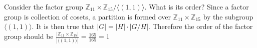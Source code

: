 \documentclass[../notes.tex]{subfiles}
\begin{document}
\begin{example}
	Consider the factor group $\mathbb{Z}_{11} \times \mathbb{Z}_{15} \slash \langle (1,1) \rangle$. What is its order? Since a factor group is collection of cosets, a partition is formed over $\mathbb{Z}_{11} \times \mathbb{Z}_{15}$ by the subgroup $\langle (1,1) \rangle$. It is then true that $|G| = |H| \cdot |G \slash H|$. Therefore the order of the factor group should be $\frac{|\mathbb{Z}_{11} \times \mathbb{Z}_{15}|}{|\langle (1,1) \rangle|} = \frac{165}{165} = 1$
\end{example}
\end{document}
